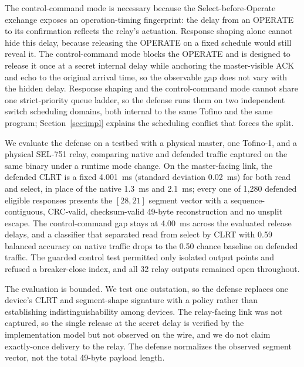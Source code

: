 The control-command mode is necessary because the Select-before-Operate exchange exposes an
operation-timing fingerprint: the delay from an OPERATE to its confirmation reflects the relay's
actuation. Response shaping alone cannot hide this delay, because releasing the OPERATE on a fixed
schedule would still reveal it. The control-command mode blocks the OPERATE and is designed to release
it once at a secret internal delay while anchoring the master-visible ACK and echo to the original
arrival time, so the observable gap does not vary with the hidden delay. Response shaping and the
control-command mode cannot share one strict-priority queue ladder, so the defense runs them on two
independent switch scheduling domains, both internal to the same Tofino and the same program;
Section~\ref{sec:impl} explains the scheduling conflict that forces the split.

We evaluate the defense on a testbed with a physical master, one Tofino-1, and a physical SEL-751 relay,
comparing native and defended traffic captured on the same binary under a runtime mode change. On the
master-facing link, the defended CLRT is a fixed 4.001~ms (standard deviation 0.02~ms) for both read
and select, in place of the native 1.3~ms and 2.1~ms; every one of 1{,}280 defended eligible responses
presents the $[28,21]$ segment vector with a sequence-contiguous, CRC-valid, checksum-valid 49-byte
reconstruction and no unsplit escape. The control-command gap stays at 4.00~ms across the evaluated release delays, and a classifier that separated read from select by CLRT with 0.59 balanced accuracy
on native traffic drops to the 0.50 chance baseline on defended traffic. The guarded control test
permitted only isolated output points and refused a breaker-close index, and all 32 relay outputs
remained open throughout.

The evaluation is bounded. We test one outstation, so the defense replaces one device's CLRT and
segment-shape signature with a policy rather than establishing indistinguishability among devices. The
relay-facing link was not captured, so the single release at the secret delay is verified by the
implementation model but not observed on the wire, and we do not claim exactly-once delivery to the
relay. The defense normalizes the observed segment vector, not the total 49-byte payload length.

